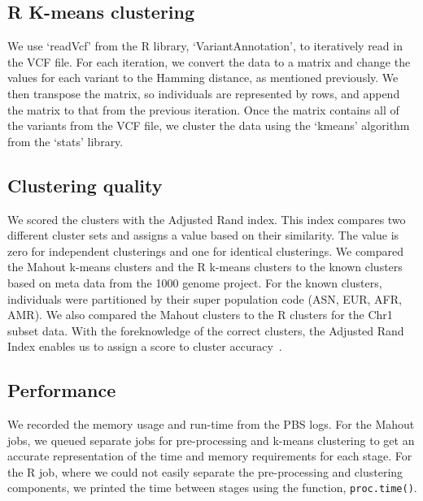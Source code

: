 \documentclass[twocolumn]{bmcart}%
\newcommand{\chrOnePop}{Chr19\_Population}
\begin{document}
\subsection*{R K-means clustering}
We use `readVcf' from the R library, `VariantAnnotation', to iteratively read in the VCF file. For each iteration, we convert the data to a matrix and
change the values for each variant to the Hamming distance, as mentioned previously. We then transpose the matrix, so individuals are represented
by rows, and append the matrix to that from the previous iteration. Once the matrix contains all of the variants from the VCF file, we cluster the data
using the `kmeans' algorithm from the `stats' library.



\subsection*{Clustering quality}
We scored the clusters with the Adjusted Rand index. 
This index compares two different cluster sets and assigns a value based on their similarity. The value is zero for independent clusterings and one for identical clusterings. We compared the Mahout k-means
clusters and the R k-means clusters to the known clusters based on meta data from the 1000 genome project. For the known clusters,
individuals were partitioned by their super population code (ASN, EUR, AFR, AMR). 
We also compared the Mahout clusters to the
R clusters for the Chr1 subset data.
With the foreknowledge of the correct clusters, the Adjusted Rand Index enables us to assign a score to cluster accuracy~\cite{Hubert1985}. 



\subsection*{Performance}
We recorded the memory usage and run-time from the PBS logs. For the Mahout jobs, we queued separate jobs
for pre-processing and k-means clustering to get an accurate representation of the time and memory requirements for each stage.
For the R job, where we could not easily separate the pre-processing and clustering components, we printed the time between
stages using the function, \texttt{proc.time()}.


\end{document}
